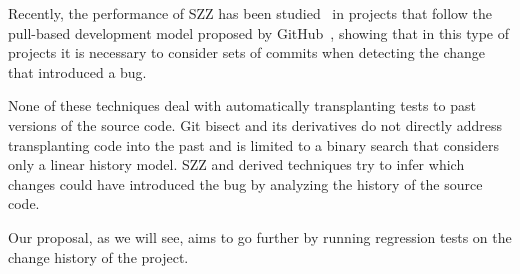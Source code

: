 Recently, the performance of SZZ has been studied~\cite{bludau2022pr,petrulio2022szz} in projects that follow the pull-based development
model proposed by GitHub~\cite{gousios2014exploratory}, showing that in this type of projects it is necessary to consider sets of commits when detecting the change that introduced a bug.

None of these techniques deal with automatically transplanting tests to past versions of the source code. 
Git bisect and its derivatives do not directly address transplanting code into the past and is limited to a binary search that considers only a linear history model.
SZZ and derived techniques try to infer which changes could have introduced the bug by analyzing the history of the source code.

Our proposal, as we will see, aims to go further by running regression tests on the change history of the project.



